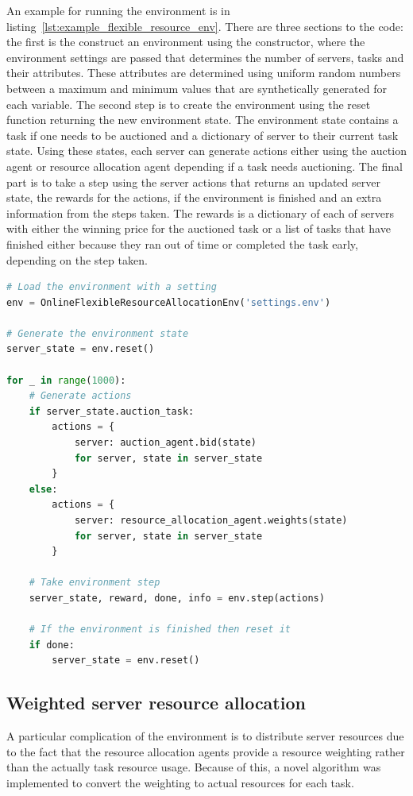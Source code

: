 An example for running the environment is in listing~\ref{lst:example_flexible_resource_env}. There are three
sections to the code: the first is the construct an environment using the constructor, where the environment settings
are passed that determines the number of servers, tasks and their attributes. These attributes are determined using
uniform random numbers between a maximum and minimum values that are synthetically generated for each variable. The
second step is to create the environment using the reset function returning the new environment state. The environment
state contains a task if one needs to be auctioned and a dictionary of server to their current task state. Using these
states, each server can generate actions either using the auction agent or resource allocation agent depending if a task
needs auctioning. The final part is to take a step using the server actions that returns an updated server state, the
rewards for the actions, if the environment is finished and an extra information from the steps taken. The rewards is a
dictionary of each of servers with either the winning price for the auctioned task or a list of tasks that have
finished either because they ran out of time or completed the task early, depending on the step taken.

\begin{lstlisting}[language=Python, frame=single, caption={Example code for running the environment}, captionpos=b, label={lst:example_flexible_resource_env}]
# Load the environment with a setting
env = OnlineFlexibleResourceAllocationEnv('settings.env')

# Generate the environment state
server_state = env.reset()

for _ in range(1000):
    # Generate actions
    if server_state.auction_task:
        actions = {
            server: auction_agent.bid(state)
            for server, state in server_state
        }
    else:
        actions = {
            server: resource_allocation_agent.weights(state)
            for server, state in server_state
        }

    # Take environment step
    server_state, reward, done, info = env.step(actions)

    # If the environment is finished then reset it
    if done:
        server_state = env.reset()
\end{lstlisting}

\subsection{Weighted server resource allocation}\label{subsec:weighted-server-resource-allocation}
A particular complication of the environment is to distribute server resources due to the fact that the resource
allocation agents provide a resource weighting rather than the actually task resource usage. Because of this, a novel
algorithm was implemented to convert the weighting to actual resources for each task.

